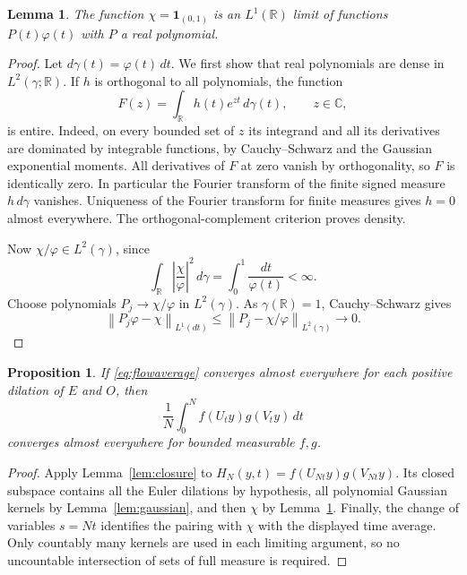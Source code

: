 \documentclass[11pt,a4paper]{article}
\newtheorem{lemma}[theorem]{Lemma}
\newtheorem{proposition}[theorem]{Proposition}
\theoremstyle{definition}
\newenvironment{statementframe}
  {\par\addvspace{4pt}\noindent
   \setlength{\fboxsep}{6pt}\setlength{\fboxrule}{0.45pt}%
   \begin{lrbox}{\statementbox}%
   \begin{minipage}{\dimexpr\linewidth-2\fboxsep-2\fboxrule\relax}}
  {\end{minipage}\end{lrbox}%
   \fbox{\usebox{\statementbox}}\par\addvspace{4pt}}
\newcommand{\R}{\mathbb R}
\newcommand{\C}{\mathbb C}
\newcommand{\1}{\mathbf1}
\newcommand{\norm}[1]{\left\lVert #1\right\rVert}
\begin{document}
\begin{statementframe}
\begin{lemma}\label{lem:density}
The function $\chi=\1_{(0,1)}$ is an $L^1(\R)$ limit of functions
$P(t)\varphi(t)$ with $P$ a real polynomial.
\end{lemma}
\end{statementframe}
\begin{proof}
Let $d\gamma(t)=\varphi(t)\,dt$. We first show that real polynomials
are dense in $L^2(\gamma;\R)$. If $h$ is orthogonal to all polynomials,
the function
\[
 F(z)=\int_\R h(t)e^{zt}\,d\gamma(t),\qquad z\in\C,
\]
is entire. Indeed, on every bounded set of $z$ its integrand and all
its derivatives are dominated by integrable functions, by
Cauchy--Schwarz and the Gaussian exponential moments. All derivatives
of $F$ at zero vanish by orthogonality, so $F$ is identically zero.
In particular the Fourier transform of the finite signed measure
$h\,d\gamma$ vanishes. Uniqueness of the Fourier transform for finite
measures gives $h=0$ almost everywhere. The orthogonal-complement
criterion proves density.

Now $\chi/\varphi\in L^2(\gamma)$, since
\[
 \int_\R\left|\frac{\chi}{\varphi}\right|^2\,d\gamma
 =\int_0^1\frac{dt}{\varphi(t)}<\infty.
\]
Choose polynomials $P_j\to\chi/\varphi$ in $L^2(\gamma)$. As
$\gamma(\R)=1$, Cauchy--Schwarz gives
\[
 \norm{P_j\varphi-\chi}_{L^1(dt)}
 \le\norm{P_j-\chi/\varphi}_{L^2(\gamma)}\longrightarrow0.
\]
\end{proof}

\begin{statementframe}
\begin{proposition}\label{prop:interval}
If \eqref{eq:flowaverage} converges almost everywhere for each positive
dilation of $E$ and $O$, then
\[
 \frac1N\int_0^N f(U_ty)g(V_ty)\,dt
\]
converges almost everywhere for bounded measurable $f,g$.
\end{proposition}
\end{statementframe}
\begin{proof}
Apply Lemma~\ref{lem:closure} to $H_N(y,t)=f(U_{Nt}y)g(V_{Nt}y)$.
Its closed subspace contains all the Euler dilations by hypothesis,
all polynomial Gaussian kernels by Lemma~\ref{lem:gaussian}, and
then $\chi$ by Lemma~\ref{lem:density}. Finally, the change of variables
$s=Nt$ identifies the pairing with $\chi$ with the displayed time
average. Only countably many kernels are used in each limiting
argument, so no uncountable intersection of sets of full measure is
required.
\end{proof}
\end{document}
